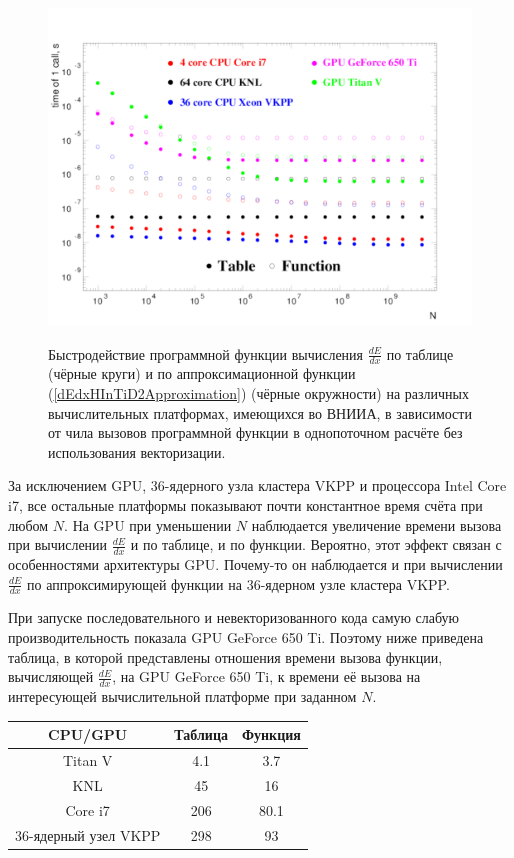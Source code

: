 \documentclass[a4paper,12pt]{article}
\begin{document}
\begin{large}
\begin{figure}[ht]
  {
     \includegraphics[width=0.99\linewidth]{images/compare_sequentially_dEdx.pdf}
  }
  \caption{Быстродействие программной функции вычисления $\frac{dE}{dx}$ по таблице (чёрные круги) и по аппроксимационной функции (\ref{dEdxHInTiD2Approximation}) (чёрные окружности) на различных вычислительных платформах, имеющихся во ВНИИА, в зависимости от чила вызовов программной функции в однопоточном расчёте без использования векторизации.}
  \label{fig:CompareSequentiallydEdx}
\end{figure}

	За исключением GPU, 36-ядерного узла кластера VKPP и процессора Intel Core i7, все остальные платформы показывают почти константное время счёта при любом $N$.
	На GPU при уменьшении $N$ наблюдается увеличение времени вызова при вычислении $\frac{dE}{dx}$ и по таблице, и по функции.
	Вероятно, этот эффект связан с особенностями архитектуры GPU. Почему-то он наблюдается и при вычислении $\frac{dE}{dx}$ по аппроксимирующей функции на 36-ядерном узле кластера VKPP. 
	
	При запуске последовательного и невекторизованного кода самую слабую производительность показала GPU GeForce 650 Ti.
	Поэтому ниже приведена таблица, в которой представлены отношения времени вызова функции, вычисляющей $\frac{dE}{dx}$, на GPU GeForce 650 Ti, к времени её вызова на интересующей вычислительной платформе при заданном $N$.

	 \begin{tabular}{|c|c|c|}
	 \hline 
	 CPU/GPU & Таблица & Функция \\ 
	 \hline 
	 Titan V & 4.1 & 3.7 \\ 
	 \hline 
	 KNL & 45 & 16 \\ 
	 \hline 
	 Core i7 & 206 & 80.1 \\ 
	 \hline 
	 36-ядерный узел VKPP & 298 & 93 \\ 
	 \hline 
	 \end{tabular} 


\end{large}
\end{document}
